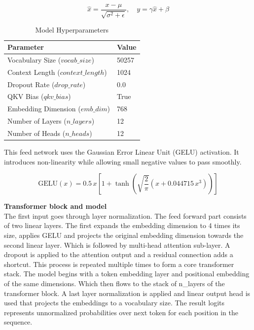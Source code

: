 \begin{equation}
\hat{x} = \frac{x - \mu}{\sqrt{\sigma^2 + \epsilon}}, \quad
y = \gamma \hat{x} + \beta
\end{equation}


\begin{table}[h]
\caption{Model Hyperparameters}
\centering
\begin{tabular}{|l|l|}
\hline
\textbf{Parameter} & \textbf{Value} \\
\hline
Vocabulary Size ($vocab\_size$) & 50257 \\
Context Length ($context\_length$) & 1024 \\
Dropout Rate ($drop\_rate$) & 0.0 \\
QKV Bias ($qkv\_bias$) & True \\
Embedding Dimension ($emb\_dim$) & 768 \\
Number of Layers ($n\_layers$) & 12 \\
Number of Heads ($n\_heads$) & 12 \\
\hline
\end{tabular}
\end{table}

This feed network uses the Gaussian Error Linear Unit (GELU) activation. It introduces non-linearity while allowing small negative values to pass smoothly.

\begin{equation}
\mathrm{GELU}(x) = 0.5 \, x \left[ 1 + \tanh \left( \sqrt{\frac{2}{\pi}} \left( x + 0.044715 \, x^3 \right) \right) \right]
\end{equation}

\textbf{Transformer block and model}\\
The first input goes through layer normalization. The feed forward part consists of two linear layers. The first expands the embedding dimension to 4 times its size, applies GELU and projects the original embedding dimension towards the second linear layer. Which is followed by multi-head attention sub-layer. A dropout is applied to the attention output and a residual connection adds a shortcut. This process is repeated multiple times to form a core transformer stack. The model begins with a token embedding layer and positional embedding of the same dimensions. Which then flows to the stack of n\_layers of the transformer block. A last layer normalization is applied and linear output head is used that projects the embeddings to a vocabulary size. The result logits represents unnormalized probabilities over next token for each position in the sequence.

